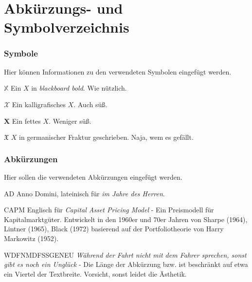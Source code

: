 
\chapter*{Abkürzungs- und Symbolverzeichnis}

\subsection*{Symbole}

Hier können Informationen zu den verwendeten Symbolen eingefügt werden.

\begin{symbollist}
	\item[$\mathbb{X}$] Ein $X$ in \textit{blackboard bold}. Wie nützlich.
	\item[$\mathcal{X}$] Ein kalligrafisches $X$. Auch süß.
	\item[$\mathbf{X}$] Ein fettes $X$. Weniger süß.
	\item[$\mathfrak{X}$] $X$ in germanischer Fraktur geschrieben. Naja, wem es gefällt.
\end{symbollist}


\subsection*{Abkürzungen}

Hier sollen die verwendeten Abkürzungen eingefügt werden.

\begin{symbollist}
	\item[AD] Anno Domini, lateinisch für \textit{im Jahre des Herren}.
	\item[CAPM] Englisch für \textit{Capital Asset Pricing Model} - Ein Preismodell für Kapitalmarktgüter. Entwickelt in den 1960er und 70er Jahren von Sharpe (1964), Lintner (1965), Black (1972) basierend auf der Portfoliotheorie von Harry Markowitz (1952).
	\item[WDFNMDFSSGENEU] \textit{Während der Fahrt nicht mit dem Fahrer sprechen, sonst gibt es noch ein Unglück} - Die Länge der Abkürzung bzw. ist beschränkt auf etwa ein Viertel der Textbreite. Vorsicht, sonst leidet die Ästhetik.
\end{symbollist}
